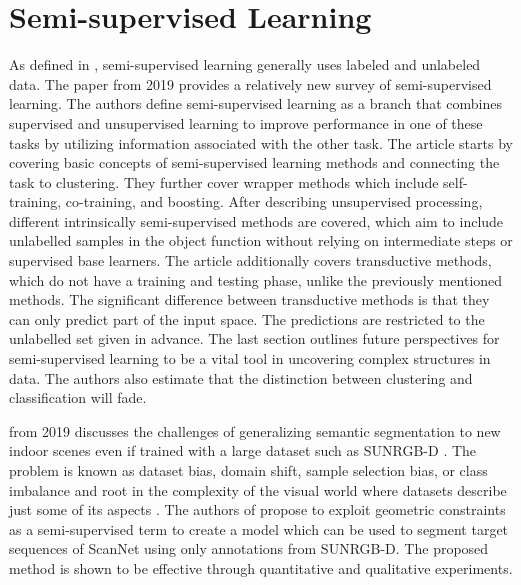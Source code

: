 \section{Semi-supervised Learning}
As defined in , semi-supervised learning generally uses labeled and unlabeled data. The paper  from 2019 provides a relatively new survey of semi-supervised learning. The authors define semi-supervised learning as a branch that combines supervised and unsupervised learning to improve performance in one of these tasks by utilizing information associated with the other task. The article starts by covering basic concepts of semi-supervised learning methods and connecting the task to clustering. They further cover wrapper methods which include self-training, co-training, and boosting. After describing unsupervised processing, different intrinsically semi-supervised methods are covered, which aim to include unlabelled samples in the object function without relying on intermediate steps or supervised base learners. The article additionally covers transductive methods, which do not have a training and testing phase, unlike the previously mentioned methods. The significant difference between transductive methods is that they can only predict part of the input space. The predictions are restricted to the unlabelled set given in advance. The last section outlines future perspectives for semi-supervised learning to be a vital tool in uncovering complex structures in data. The authors also estimate that the distinction between clustering and classification will fade.

 \cite{https://doi.org/10.48550/arxiv.1904.12534} from 2019 discusses the challenges of generalizing semantic segmentation to new indoor scenes even if trained with a large dataset such as SUNRGB-D \cite{song2015sun}. The problem is known as dataset bias, domain shift, sample selection bias, or class imbalance and root in the complexity of the visual world where datasets describe just some of its aspects \cite{tommasi2017deeper}. The authors of \cite{https://doi.org/10.48550/arxiv.1904.12534} propose to exploit geometric constraints as a semi-supervised term to create a model which can be used to segment target sequences of ScanNet\cite{dai2017scannet} using only annotations from SUNRGB-D. The proposed method is shown to be effective through quantitative and qualitative experiments.

